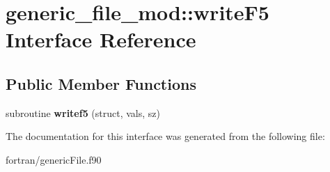 \hypertarget{interfacegeneric__file__mod_1_1write_f5}{}\section{generic\+\_\+file\+\_\+mod\+:\+:write\+F5 Interface Reference}
\label{interfacegeneric__file__mod_1_1write_f5}
\subsection*{Public Member Functions}
\begin{DoxyCompactItemize}
\item 
\mbox{\label{interfacegeneric__file__mod_1_1write_f5_a5f1752779d4b4be157937a612d4a67a0}} 
subroutine {\bfseries writef5} (struct, vals, sz)
\end{DoxyCompactItemize}


The documentation for this interface was generated from the following file\+:\begin{DoxyCompactItemize}
\item 
fortran/generic\+File.\+f90\end{DoxyCompactItemize}

